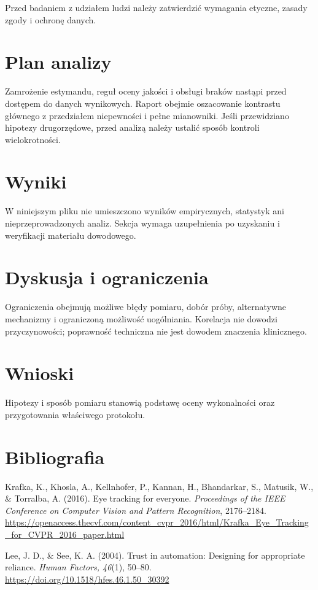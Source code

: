 \documentclass[11pt,a4paper]{article}
\begin{document}
Przed badaniem z udziałem ludzi należy zatwierdzić wymagania etyczne, zasady zgody i ochronę danych.

\section{Plan analizy}

Zamrożenie estymandu, reguł oceny jakości i obsługi braków nastąpi przed dostępem do danych wynikowych. Raport obejmie oszacowanie kontrastu głównego z przedziałem niepewności i pełne mianowniki. Jeśli przewidziano hipotezy drugorzędowe, przed analizą należy ustalić sposób kontroli wielokrotności.

\section{Wyniki}

W niniejszym pliku nie umieszczono wyników empirycznych, statystyk ani nieprzeprowadzonych analiz. Sekcja wymaga uzupełnienia po uzyskaniu i weryfikacji materiału dowodowego.

\section{Dyskusja i ograniczenia}

Ograniczenia obejmują możliwe błędy pomiaru, dobór próby, alternatywne mechanizmy i ograniczoną możliwość uogólniania. Korelacja nie dowodzi przyczynowości; poprawność techniczna nie jest dowodem znaczenia klinicznego.

\section{Wnioski}

Hipotezy i sposób pomiaru stanowią podstawę oceny wykonalności oraz przygotowania właściwego protokołu.

\section*{Bibliografia}

{\setlength{\parindent}{0pt}
\setlength{\parskip}{5pt}
\hangindent=1.27cm
Krafka, K., Khosla, A., Kellnhofer, P., Kannan, H., Bhandarkar, S., Matusik, W., \& Torralba, A. (2016). Eye tracking for everyone. \textit{Proceedings of the IEEE Conference on Computer Vision and Pattern Recognition}, 2176--2184. \url{https://openaccess.thecvf.com/content_cvpr_2016/html/Krafka_Eye_Tracking_for_CVPR_2016_paper.html}\par
\hangindent=1.27cm
Lee, J. D., \& See, K. A. (2004). Trust in automation: Designing for appropriate reliance. \textit{Human Factors, 46}(1), 50--80. \url{https://doi.org/10.1518/hfes.46.1.50_30392}\par
}
\end{document}
